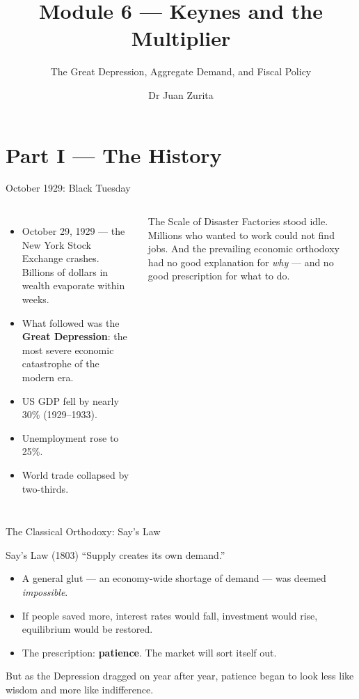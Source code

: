 \documentclass[aspectratio=169, 10pt]{beamer}
\title{Module 6 --- Keynes and the Multiplier}
\subtitle{The Great Depression, Aggregate Demand, and Fiscal Policy}
\author{Dr Juan Zurita}
\institute{From Smith to Simulation\\
The University of Edinburgh~$\cdot$~School of Economics}
\date{}
\begin{document}
\maketitle

\section{Part I --- The History}

\begin{frame}{October 1929: Black Tuesday}
\begin{columns}[T]
\begin{itemize}
  \item October 29, 1929 --- the New York Stock Exchange crashes.
        Billions of dollars in wealth evaporate within weeks.
  \item What followed was the \textbf{Great Depression}: the most severe
        economic catastrophe of the modern era.
  \item US GDP fell by nearly \alert{30\%} (1929--1933).
  \item Unemployment rose to \alert{25\%}.
  \item World trade collapsed by \alert{two-thirds}.
\end{itemize}
\begin{block}{The Scale of Disaster}
Factories stood idle. Millions who wanted to work could not find jobs.
And the prevailing economic orthodoxy had no good explanation for
\textit{why} --- and no good prescription for what to do.
\end{block}
\end{columns}
\end{frame}

\begin{frame}{The Classical Orthodoxy: Say's Law}
\begin{block}{Say's Law (1803)}
  ``Supply creates its own demand.''
  \begin{itemize}
    \item A general glut --- an economy-wide shortage of demand ---
          was deemed \textit{impossible}.
    \item If people saved more, interest rates would fall,
          investment would rise, equilibrium would be restored.
    \item The prescription: \textbf{patience}. The market will sort itself out.
  \end{itemize}
\end{block}
\vspace{0.5em}
But as the Depression dragged on year after year, patience began to look
less like wisdom and more like \alert{indifference}.
\end{frame}
\end{document}
